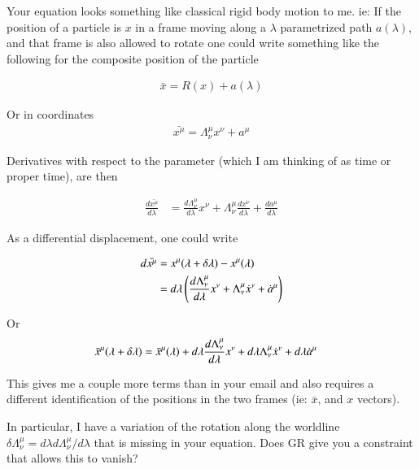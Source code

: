 \documentclass{article}
\begin{document}

Your equation looks something like classical rigid body motion to me. ie: 
If the position of a particle is $x$ in a frame moving along a $\lambda$ parametrized path $a(\lambda)$, and that
frame is also allowed to rotate one could write something like the following for the
composite position of the particle

\begin{align*}
\bar{x} = R(x) + a(\lambda)
\end{align*}

Or in coordinates
\begin{align*}
\bar{x^\mu} = \Lambda^\mu_\nu x^\nu + a^\mu
\end{align*}

Derivatives with respect to the parameter (which I am thinking of as time or proper time), are then

\begin{align*}
\frac{d\bar{x^\mu}}{d\lambda} 
&= 
\frac{d \Lambda^\mu_\nu}{d\lambda} x^\nu 
+ \Lambda^\mu_\nu \frac{d x^\nu}{d\lambda}
+ \frac{d a^\mu}{d\lambda}
\end{align*}

As a differential displacement, one could write

\begin{align*}
d\bar{x^\mu}
&= x^\mu(\lambda + \delta\lambda) - x^\mu(\lambda) \\
&= 
d\lambda \left(
\frac{d \Lambda^\mu_\nu}{d\lambda} x^\nu 
+ \Lambda^\mu_\nu \dot{x}^\nu
+ \dot{a}^\mu
\right)
\end{align*}

Or
\begin{align}\label{eqn:part1}
\bar{x}^\mu(\lambda + \delta\lambda) 
&= \bar{x}^\mu(\lambda)
+ d\lambda \frac{d \Lambda^\mu_\nu}{d\lambda} x^\nu 
+ d\lambda \Lambda^\mu_\nu \dot{x}^\nu
+ d\lambda \dot{a}^\mu
\end{align}

This gives me a couple more terms than in your email
and also requires a different identification of the positions in the two frames (ie: $\bar{x}$, and $x$ vectors).

In particular, I have a variation of the rotation along the worldline $\delta \Lambda^\mu_\nu = d\lambda d\Lambda^\mu_\nu/d\lambda$ that is missing
in your equation.  Does GR give you a constraint that allows this to vanish?
\end{document}
